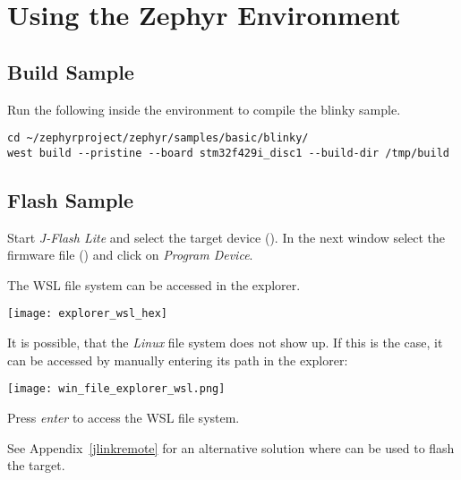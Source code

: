 \newpage

\section{Using the Zephyr Environment}

\subsection{Build Sample}

Run the following inside the environment to compile the blinky sample.

\begin{lstlisting}
cd ~/zephyrproject/zephyr/samples/basic/blinky/
west build --pristine --board stm32f429i_disc1 --build-dir /tmp/build
\end{lstlisting}


\subsection{Flash Sample}

Start \emph{J-Flash Lite} and select the target device (\mcutype{}). In the next
window select the firmware file () and click on
\emph{Program Device}.


\begin{infobox}
  The WSL file system can be accessed in the explorer.
  \begin{center}
    \texttt{[image: explorer\_wsl\_hex]}
  \end{center}

  It is possible, that the \emph{Linux} file system does not show up. If this is
  the case, it can be accessed by manually entering its path in the explorer:
  \mono{\\\\wsl\$}
  \begin{center}
    \texttt{[image: win\_file\_explorer\_wsl.png]}
  \end{center}
  Press \emph{enter} to access the WSL file system.
\end{infobox}

See Appendix~\ref{jlinkremote} for an alternative solution where  can be used to flash the target.

